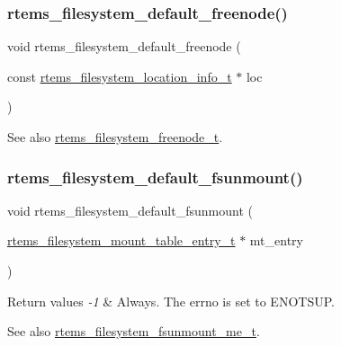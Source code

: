 \subsubsection{\texorpdfstring{rtems\_filesystem\_default\_freenode()}{rtems\_filesystem\_default\_freenode()}}
{\footnotesize\ttfamily void rtems\+\_\+filesystem\+\_\+default\+\_\+freenode (\begin{DoxyParamCaption}\item[{const \mbox{\hyperlink{group__LibIO_ga3252b3d31ee3c49ffff0b7604a676864}{rtems\+\_\+filesystem\+\_\+location\+\_\+info\+\_\+t}} $\ast$}]{loc }\end{DoxyParamCaption})}

\begin{DoxySeeAlso}{See also}
\mbox{\hyperlink{group__LibIOFSOps_gae151461f446627c1bee2a12decf99745}{rtems\+\_\+filesystem\+\_\+freenode\+\_\+t}}. 
\end{DoxySeeAlso}
\mbox{\label{group__LibIOFSOps_ga8ccbdac4957138c89d1ca6000f4e7382}} 
\subsubsection{\texorpdfstring{rtems\_filesystem\_default\_fsunmount()}{rtems\_filesystem\_default\_fsunmount()}}
{\footnotesize\ttfamily void rtems\+\_\+filesystem\+\_\+default\+\_\+fsunmount (\begin{DoxyParamCaption}\item[{\mbox{\hyperlink{structrtems__filesystem__mount__table__entry__tt}{rtems\+\_\+filesystem\+\_\+mount\+\_\+table\+\_\+entry\+\_\+t}} $\ast$}]{mt\+\_\+entry }\end{DoxyParamCaption})}


\begin{DoxyRetVals}{Return values}
{\em -\/1} & Always. The errno is set to E\+N\+O\+T\+S\+UP.\\
\hline
\end{DoxyRetVals}
\begin{DoxySeeAlso}{See also}
\mbox{\hyperlink{group__LibIOFSOps_ga2f385e23e8448df4e51240f8377aac43}{rtems\+\_\+filesystem\+\_\+fsunmount\+\_\+me\+\_\+t}}. 
\end{DoxySeeAlso}
\mbox{\label{group__LibIOFSOps_gaf49aa8c3671b5c5282bb3f865b8e162a}} 
